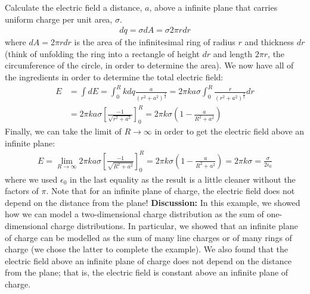 \begin{example}{Calculate the electric field a distance, $a$, above a infinite plane that carries uniform charge per unit area, $\sigma$.}
\begin{align*}
dq = \sigma dA=\sigma 2\pi r dr
\end{align*}
where $dA=2\pi r dr$ is the area of the infinitesimal ring of radius $r$ and thickness $dr$ (think of unfolding the ring into a rectangle of height $dr$ and length $2\pi r$, the circumference of the circle, in order to determine the area). We now have all of the ingredients in order to determine the total electric field:
\begin{align*}
E &= \int dE = \int_0^R kdq\frac{a}{(r^2+a^2)^\frac{3}{2}}  = 2\pi k a \sigma \int_0^R \frac{r}{(r^2+a^2)^\frac{3}{2}}dr\\
&=2\pi k a \sigma \left[  \frac{-1}{\sqrt{r^2+a^2}}\right]_0^R=2\pi k  \sigma\left(1-\frac{a}{R^2+a^2} \right)
\end{align*}
Finally, we can take the limit of $R\to\infty$ in order to get the electric field above an infinite plane:
\begin{align*}
E=\lim_{R\to\infty}2\pi k a \sigma \left[  \frac{-1}{\sqrt{R^2+a^2}}\right]_0^R=2\pi k  \sigma\left(1-\frac{a}{R^2+a^2} \right)=2\pi k\sigma=\frac{\sigma}{2\epsilon_0}
\end{align*}
where we used $\epsilon_0$ in the last equality as the result is a little cleaner without the factors of $\pi$. Note that for an infinite plane of charge, the electric field does not depend on the distance from the plane!
\textbf{Discussion:} In this example, we showed how we can model a two-dimensional charge distribution as the sum of one-dimensional charge distributions. In particular, we showed that an infinite plane of charge can be modelled as the sum of many line charges or of many rings of charge (we chose the latter to complete the example). We also found that the electric field above an infinite plane of charge does not depend on the distance from the plane; that is, the electric field is constant above an infinite plane of charge. 
\end{example}
